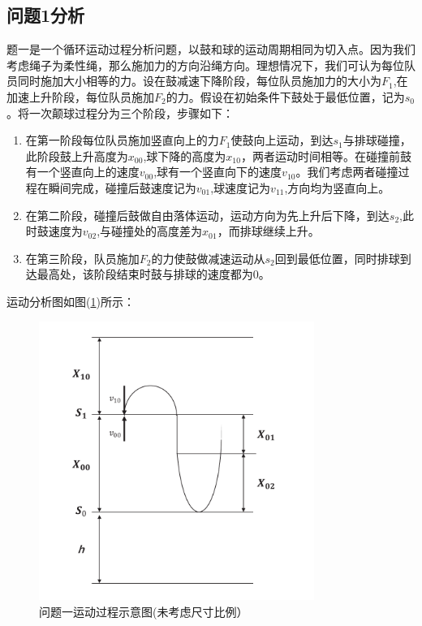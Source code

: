 \documentclass{cumcm}
\begin{document}
\subsection{问题1分析}
题一是一个循环运动过程分析问题，以鼓和球的运动周期相同为切入点。因为我们考虑绳子为柔性绳，那么施加力的方向沿绳方向。理想情况下，我们可认为每位队员同时施加大小相等的力。设在鼓减速下降阶段，每位队员施加力的大小为$F_1$,在加速上升阶段，每位队员施加$F_2$的力。假设在初始条件下鼓处于最低位置，记为$s_0$。将一次颠球过程分为三个阶段，步骤如下：
\begin{enumerate}
\item 在第一阶段每位队员施加竖直向上的力$F_1$使鼓向上运动，到达$s_1$与排球碰撞，此阶段鼓上升高度为$x_{00}$,球下降的高度为$x_{10}$，两者运动时间相等。在碰撞前鼓有一个竖直向上的速度$v_{00}$,球有一个竖直向下的速度$v_{10}$。我们考虑两者碰撞过程在瞬间完成，碰撞后鼓速度记为$v_{01}$,球速度记为$v_{11}$,方向均为竖直向上。
\item 在第二阶段，碰撞后鼓做自由落体运动，运动方向为先上升后下降，到达$s_2$,此时鼓速度为$v_{02}$,与碰撞处的高度差为$x_{01}$，而排球继续上升。
\item 在第三阶段，队员施加$F_2$的力使鼓做减速运动从$s_2$回到最低位置，同时排球到达最高处，该阶段结束时鼓与排球的速度都为$0$。
\end{enumerate}
\quad \quad
运动分析图如图(\ref{fig-buoy})所示：
\begin{figure}[H]
\centering
\includegraphics[width=0.8\textwidth]{img/question1.pdf}
\caption{问题一运动过程示意图(未考虑尺寸比例）}\label{fig-buoy}
\end{figure}
\end{document}
